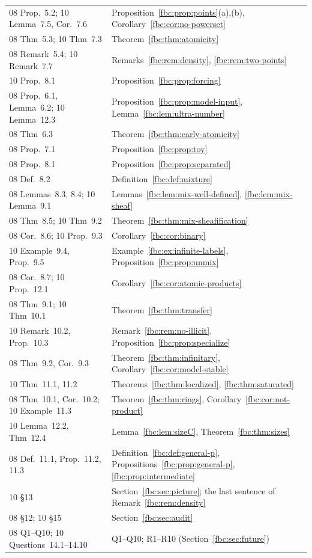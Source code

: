 \documentclass[11pt,letterpaper]{article}
\theoremstyle{definition}
\theoremstyle{remark}
\begin{document}
\begin{longtable}{@{}p{}p{}@{}}
08 Prop.~5.2; 10 Lemma~7.5, Cor.~7.6 & Proposition~\ref{fbc:prop:points}(a),(b), Corollary~\ref{fbc:cor:no-powerset}\\
08 Thm~5.3; 10 Thm~7.3 & Theorem~\ref{fbc:thm:atomicity}\\
08 Remark~5.4; 10 Remark~7.7 & Remarks~\ref{fbc:rem:density}, \ref{fbc:rem:two-points}\\
10 Prop.~8.1 & Proposition~\ref{fbc:prop:forcing}\\
08 Prop.~6.1, Lemma~6.2; 10 Lemma~12.3 & Proposition~\ref{fbc:prop:model-input}, Lemma~\ref{fbc:lem:ultra-number}\\
08 Thm~6.3 & Theorem~\ref{fbc:thm:early-atomicity}\\
08 Prop.~7.1 & Proposition~\ref{fbc:prop:toy}\\
08 Prop.~8.1 & Proposition~\ref{fbc:prop:separated}\\
08 Def.~8.2 & Definition~\ref{fbc:def:mixture}\\
08 Lemmas~8.3, 8.4; 10 Lemma~9.1 & Lemmas~\ref{fbc:lem:mix-well-defined}, \ref{fbc:lem:mix-sheaf}\\
08 Thm~8.5; 10 Thm~9.2 & Theorem~\ref{fbc:thm:mix-sheafification}\\
08 Cor.~8.6; 10 Prop.~9.3 & Corollary~\ref{fbc:cor:binary}\\
10 Example~9.4, Prop.~9.5 & Example~\ref{fbc:ex:infinite-labels}, Proposition~\ref{fbc:prop:unmix}\\
08 Cor.~8.7; 10 Prop.~12.1 & Corollary~\ref{fbc:cor:atomic-products}\\
08 Thm~9.1; 10 Thm~10.1 & Theorem~\ref{fbc:thm:transfer}\\
10 Remark~10.2, Prop.~10.3 & Remark~\ref{fbc:rem:no-illicit}, Proposition~\ref{fbc:prop:specialize}\\
08 Thm~9.2, Cor.~9.3 & Theorem~\ref{fbc:thm:infinitary}, Corollary~\ref{fbc:cor:model-stable}\\
10 Thm~11.1, 11.2 & Theorems~\ref{fbc:thm:localized}, \ref{fbc:thm:saturated}\\
08 Thm~10.1, Cor.~10.2; 10 Example~11.3 & Theorem~\ref{fbc:thm:rings}, Corollary~\ref{fbc:cor:not-product}\\
10 Lemma~12.2, Thm~12.4 & Lemma~\ref{fbc:lem:sizeC}, Theorem~\ref{fbc:thm:sizes}\\
08 Def.~11.1, Prop.~11.2, 11.3 & Definition~\ref{fbc:def:general-p}, Propositions~\ref{fbc:prop:general-p}, \ref{fbc:prop:intermediate}\\
10 \S13 & Section~\ref{fbc:sec:picture}; the last sentence of Remark~\ref{fbc:rem:density}\\
08 \S12; 10 \S15 & Section~\ref{fbc:sec:audit}\\
08 Q1--Q10; 10 Questions~14.1--14.10 & Q1--Q10; R1--R10 (Section~\ref{fbc:sec:future})\\
\bottomrule
\end{longtable}
\normalsize
\end{document}
